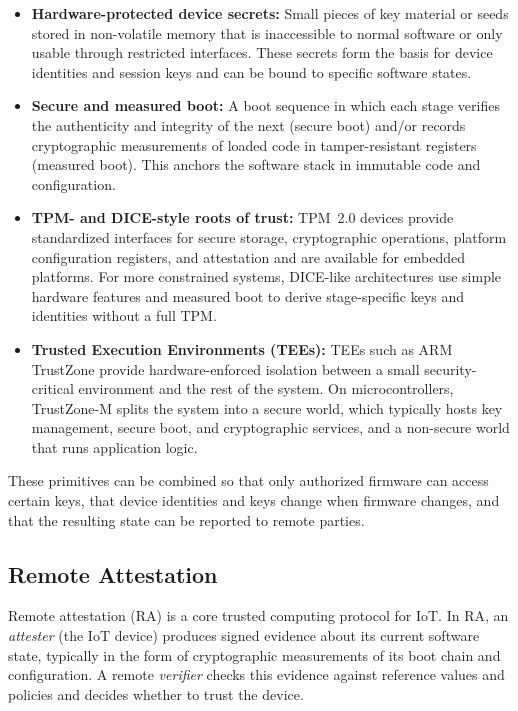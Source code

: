 \documentclass[conference,11pt,a4paper]{IEEEtran}
\begin{document}
\begin{itemize}
  \item \textbf{Hardware-protected device secrets:} Small pieces of key material or seeds stored in non-volatile memory that is inaccessible to normal software or only usable through restricted interfaces. These secrets form the basis for device identities and session keys and can be bound to specific software states.
  \item \textbf{Secure and measured boot:} A boot sequence in which each stage verifies the authenticity and integrity of the next (secure boot) and/or records cryptographic measurements of loaded code in tamper-resistant registers (measured boot). This anchors the software stack in immutable code and configuration.
  \item \textbf{TPM- and DICE-style roots of trust:} TPM~2.0 devices provide standardized interfaces for secure storage, cryptographic operations, platform configuration registers, and attestation and are available for embedded platforms.\cite{tcg_tpm_iot} For more constrained systems, DICE-like architectures use simple hardware features and measured boot to derive stage-specific keys and identities without a full TPM.
  \item \textbf{Trusted Execution Environments (TEEs):} TEEs such as ARM TrustZone provide hardware-enforced isolation between a small security-critical environment and the rest of the system.\cite{tee_trustcom} On microcontrollers, TrustZone-M splits the system into a secure world, which typically hosts key management, secure boot, and cryptographic services, and a non-secure world that runs application logic.\cite{tzm_runtime,tzm_framework}
\end{itemize}

These primitives can be combined so that only authorized firmware can access certain keys, that device identities and keys change when firmware changes, and that the resulting state can be reported to remote parties.

\subsection{Remote Attestation}
Remote attestation (RA) is a core trusted computing protocol for IoT. In RA, an \emph{attester} (the IoT device) produces signed evidence about its current software state, typically in the form of cryptographic measurements of its boot chain and configuration. A remote \emph{verifier} checks this evidence against reference values and policies and decides whether to trust the device.\cite{ra_survey,resource_constrained}
\end{document}

